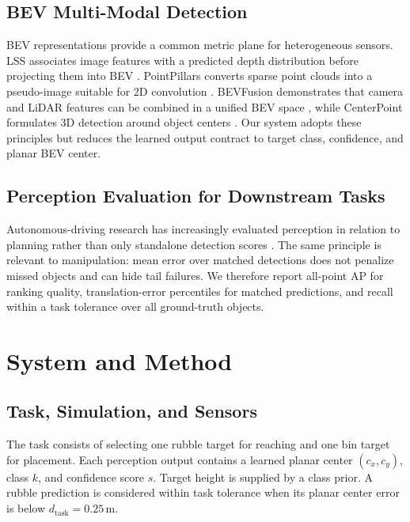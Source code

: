 \documentclass[conference]{IEEEtran}
\begin{document}
\subsection{BEV Multi-Modal Detection}

BEV representations provide a common metric plane for heterogeneous sensors. LSS associates image features with a predicted depth distribution before projecting them into BEV \cite{philion2020lss}. PointPillars converts sparse point clouds into a pseudo-image suitable for 2D convolution \cite{lang2019pointpillars}. BEVFusion demonstrates that camera and LiDAR features can be combined in a unified BEV space \cite{liu2023bevfusion,liang2022bevfusion}, while CenterPoint formulates 3D detection around object centers \cite{yin2021centerpoint}. Our system adopts these principles but reduces the learned output contract to target class, confidence, and planar BEV center.

\subsection{Perception Evaluation for Downstream Tasks}

Autonomous-driving research has increasingly evaluated perception in relation to planning rather than only standalone detection scores \cite{hu2023uniad}. The same principle is relevant to manipulation: mean error over matched detections does not penalize missed objects and can hide tail failures. We therefore report all-point AP for ranking quality, translation-error percentiles for matched predictions, and recall within a task tolerance over all ground-truth objects.

\section{System and Method}

\subsection{Task, Simulation, and Sensors}

The task consists of selecting one rubble target for reaching and one bin target for placement. Each perception output contains a learned planar center $(c_x,c_y)$, class $k$, and confidence score $s$. Target height is supplied by a class prior. A rubble prediction is considered within task tolerance when its planar center error is below $d_{\mathrm{task}}=0.25$\,m.
\end{document}
